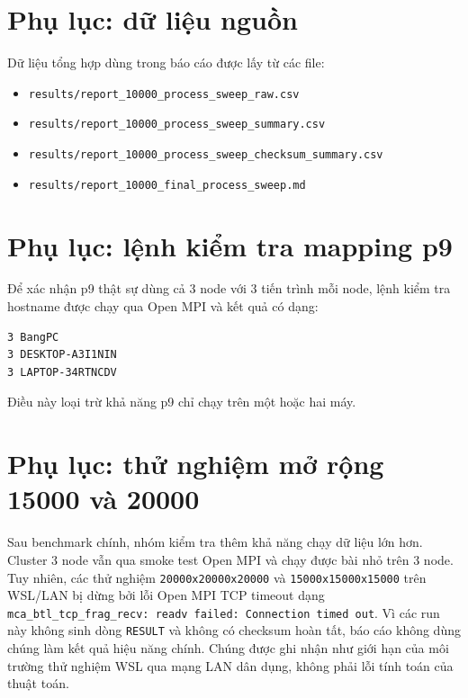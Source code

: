 \documentclass[12pt,a4paper]{article}
\newcommand{\code}[1]{\texttt{#1}}
\begin{document}
\newpage
\appendix
\section{Phụ lục: dữ liệu nguồn}
Dữ liệu tổng hợp dùng trong báo cáo được lấy từ các file:
\begin{itemize}
  \item \code{results/report\_10000\_process\_sweep\_raw.csv}
  \item \code{results/report\_10000\_process\_sweep\_summary.csv}
  \item \code{results/report\_10000\_process\_sweep\_checksum\_summary.csv}
  \item \code{results/report\_10000\_final\_process\_sweep.md}
\end{itemize}

\section{Phụ lục: lệnh kiểm tra mapping p9}
Để xác nhận p9 thật sự dùng cả 3 node với 3 tiến trình mỗi node, lệnh kiểm tra hostname được chạy qua Open MPI và kết quả có dạng:
\begin{lstlisting}
3 BangPC
3 DESKTOP-A3I1NIN
3 LAPTOP-34RTNCDV
\end{lstlisting}

Điều này loại trừ khả năng p9 chỉ chạy trên một hoặc hai máy.

\section{Phụ lục: thử nghiệm mở rộng 15000 và 20000}
Sau benchmark chính, nhóm kiểm tra thêm khả năng chạy dữ liệu lớn hơn. Cluster 3 node vẫn qua smoke test Open MPI và chạy được bài nhỏ trên 3 node. Tuy nhiên, các thử nghiệm \code{20000x20000x20000} và \code{15000x15000x15000} trên WSL/LAN bị dừng bởi lỗi Open MPI TCP timeout dạng \code{mca\_btl\_tcp\_frag\_recv: readv failed: Connection timed out}. Vì các run này không sinh dòng \code{RESULT} và không có checksum hoàn tất, báo cáo không dùng chúng làm kết quả hiệu năng chính. Chúng được ghi nhận như giới hạn của môi trường thử nghiệm WSL qua mạng LAN dân dụng, không phải lỗi tính toán của thuật toán.
\end{document}
